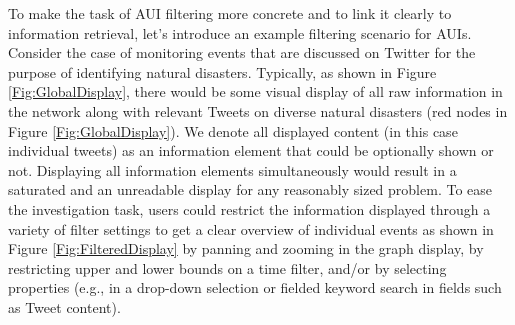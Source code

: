 To make the task of AUI filtering more concrete and to link it clearly
to information retrieval, let's introduce an example filtering
scenario for AUIs. 
Consider the case of monitoring events that are discussed on Twitter for the purpose of identifying natural disasters. Typically, as shown in Figure \ref{Fig:GlobalDisplay}, there would be some visual display of all raw information in the network along with relevant Tweets on diverse natural disasters (red nodes in Figure \ref{Fig:GlobalDisplay}). We denote all displayed content (in this case individual tweets)
as an information element that could
be optionally shown or not.  Displaying all information elements simultaneously
would result in a saturated and an unreadable display for any reasonably sized 
 problem. To ease the investigation task, users could restrict the information displayed
through a variety of filter settings to get a clear overview of individual events as shown in Figure \ref{Fig:FilteredDisplay} \textendash{} by panning and
zooming in the graph display, by restricting upper and lower bounds
on a time filter, and/or by selecting properties (e.g., in a drop-down
selection or fielded keyword search in fields such as Tweet content). 





